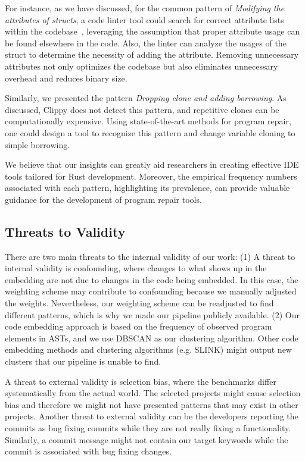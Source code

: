 For instance, as we have discussed, for the common pattern of \textit{Modifying the attributes of structs}, a code linter tool could search for correct attribute lists within the codebase~\citep{forrest2009genetic}, leveraging the assumption that proper attribute usage can be found elsewhere in the code. Also, the linter can analyze the usages of the struct to determine the necessity of adding the attribute. Removing unnecessary attributes not only optimizes the codebase but also eliminates unnecessary overhead and reduces binary size.

Similarly, we presented the pattern \textit{Dropping clone and adding borrowing}. As discussed, Clippy does not detect this pattern, and repetitive clones can be computationally expensive. Using state-of-the-art methods for program repair, one could design a tool to recognize this pattern and change variable cloning to simple borrowing.

We believe that our insights can greatly aid researchers in creating effective IDE tools tailored for Rust development. Moreover, the empirical frequency numbers associated with each pattern, highlighting its prevalence, can provide valuable guidance for the development of program repair tools.



\subsection{Threats to Validity}

There are two main threats to the internal validity of our work: (1) A threat to internal validity is confounding, where changes to what shows up in the embedding are not due to changes in the code being embedded. In this case, the weighting scheme may contribute to confounding because we manually adjusted the weights. Nevertheless, our weighting scheme can be readjusted to find different patterns, which is why we made our pipeline publicly available. (2) Our code embedding approach is based on the frequency of observed program elements in ASTs, and we use DBSCAN as our clustering algorithm. Other code embedding methods and clustering algorithms (e.g. SLINK) might output new clusters that our pipeline is unable to find.

A threat to external validity is selection bias, where the benchmarks differ systematically from the actual world. The selected projects might cause selection bias and therefore we might not have presented patterns that may exist in other projects. Another threat to external validity can be the developers reporting the commits as bug fixing commits while they are not really fixing a functionality. Similarly, a commit message might not contain our target keywords while the commit is associated with bug fixing changes.
